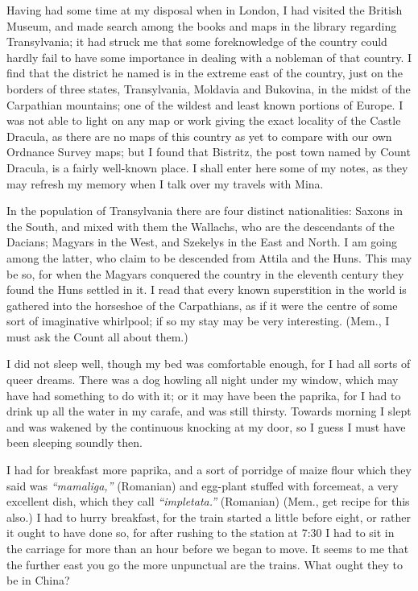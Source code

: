 \documentclass{article}
\begin{document}
				Having had some time at my disposal when in London, I had visited the British Museum, and made search among the books and maps in the library regarding Transylvania; it had struck me that some foreknowledge of the country could hardly fail to have some importance in dealing with a nobleman of that country. I find that the district he named is in the extreme east of the country, just on the borders of three states, Transylvania, Moldavia and Bukovina, in the midst of the Carpathian mountains; one of the wildest and least known portions of Europe. I was not able to light on any map or work giving the exact locality of the Castle Dracula, as there are no maps of this country as yet to compare with our own Ordnance Survey maps; but I found that Bistritz, the post town named by Count Dracula, is a fairly well-known place. I shall enter here some of my notes, as they may refresh my memory when I talk over my travels with Mina.\par\bigskip
				
				In the population of Transylvania there are four distinct nationalities: Saxons in the South, and mixed with them the Wallachs, who are the descendants of the Dacians; Magyars in the West, and Szekelys in the East and North. I am going among the latter, who claim to be descended from Attila and the Huns. This may be so, for when the Magyars conquered the country in the eleventh century they found the Huns settled in it. I read that every known superstition in the world is gathered into the horseshoe of the Carpathians, as if it were the centre of some sort of imaginative whirlpool; if so my stay may be very interesting. (Mem., I must ask the Count all about them.)\par\bigskip
				
				I did not sleep well, though my bed was comfortable enough, for I had all sorts of queer dreams. There was a dog howling all night under my window, which may have had something to do with it; or it may have been the paprika, for I had to drink up all the water in my carafe, and was still thirsty. Towards morning I slept and was wakened by the continuous knocking at my door, so I guess I must have been sleeping soundly then.\par\bigskip
				
				I had for breakfast more paprika, and a sort of porridge of maize flour which they said was \textit{“mamaliga,”} (Romanian) and egg-plant stuffed with forcemeat, a very excellent dish, which they call \textit{“impletata.”} (Romanian) (Mem., get recipe for this also.) I had to hurry breakfast, for the train started a little before eight, or rather it ought to have done so, for after rushing to the station at 7:30 I had to sit in the carriage for more than an hour before we began to move. It seems to me that the further east you go the more unpunctual are the trains. What ought they to be in China?\par\bigskip
				
\end{document}
